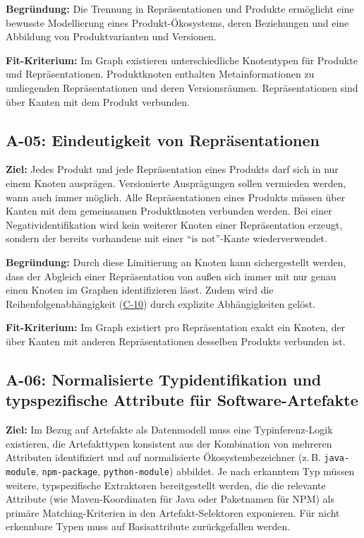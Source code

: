 \textbf{Begründung:}
Die Trennung in Repräsentationen und Produkte ermöglicht eine bewusste Modellierung eines Produkt-Ökosystems, deren Beziehungen und eine Abbildung von Produktvarianten und Versionen.

\textbf{Fit-Kriterium:}
Im Graph existieren unterschiedliche Knotentypen für Produkte und Repräsentationen.
Produktknoten enthalten Metainformationen zu umliegenden Repräsentationen und deren Versionsräumen.
Repräsentationen sind über Kanten mit dem Produkt verbunden.

\subsection{A-05: Eindeutigkeit von Repräsentationen}\label{subsec:req-unique-product-representations}

\textbf{Ziel:}
Jedes Produkt und jede Repräsentation eines Produkts darf sich in nur einem Knoten ausprägen.
Versionierte Ausprägungen sollen vermieden werden, wann auch immer möglich.
Alle Repräsentationen eines Produkts müssen über Kanten mit dem gemeinsamen Produktknoten verbunden werden.
Bei einer Negatividentifikation wird kein weiterer Knoten einer Repräsentation erzeugt, sondern der bereits vorhandene mit einer \enquote{is not}-Kante wiederverwendet.

\textbf{Begründung:}
Durch diese Limitierung an Knoten kann sichergestellt werden, dass der Abgleich einer Repräsentation von außen sich immer mit nur genau einen Knoten im Graphen identifizieren lässt.
Zudem wird die Reihenfolgenabhängigkeit (\hyperref[subsec:c-10-order-dependency]{C-10}) durch explizite Abhängigkeiten gelöst.

\textbf{Fit-Kriterium:}
Im Graph existiert pro Repräsentation exakt ein Knoten, der über Kanten mit anderen Repräsentationen desselben Produkts verbunden ist.

\subsection{A-06: Normalisierte Typidentifikation und typspezifische Attribute für Software-Artefakte}\label{subsec:req-type-specific-matching}

\textbf{Ziel:}
Im Bezug auf Artefakte als Datenmodell muss eine Typinferenz-Logik existieren, die Artefakttypen konsistent aus der Kombination von mehreren Attributen identifiziert und auf normalisierte Ökosystembezeichner (z.\,B. \texttt{java-module}, \texttt{npm-package}, \texttt{python-module}) abbildet.
Je nach erkanntem Typ müssen weitere, typspezifische Extraktoren bereitgestellt werden, die die relevante Attribute (wie Maven-Koordinaten für Java oder Paketnamen für NPM) als primäre Matching-Kriterien in den Artefakt-Selektoren exponieren.
Für nicht erkennbare Typen muss auf Basisattribute zurückgefallen werden.

